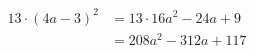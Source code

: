 \documentclass[a4paper]{article}
\begin{document}
\thispagestyle{empty}

\begin{align*}
  13 \cdot (4a - 3)^2 &= 13 \cdot 16 a^2 - 24 a + 9 \\
      &= 208a^2 - 312a + 117
\end{align*}
\end{document}
